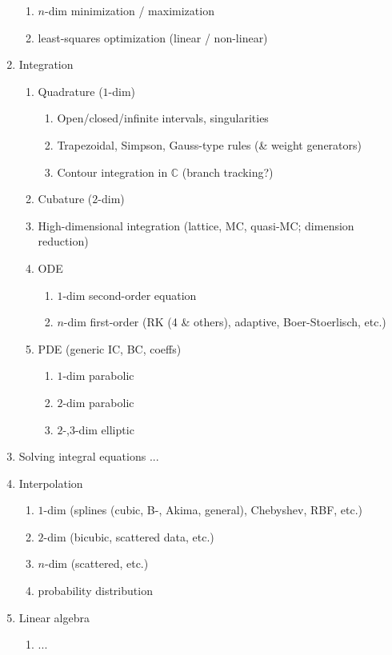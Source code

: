 \documentclass[10pt,dvipdfmx,letterpaper,twoside]{article}
\newcommand{\CC}{{\mathbb{C}}}
\begin{document}
\begin{enumerate}
\begin{enumerate}
  \item $n$-dim minimization / maximization
  \item least-squares optimization (linear / non-linear)
  \end{enumerate}
\item Integration
  \begin{enumerate}
  \item Quadrature ($1$-dim)
    \begin{enumerate}
    \item Open/closed/infinite intervals, singularities
    \item Trapezoidal, Simpson, Gauss-type rules (\& weight generators)
    \item Contour integration in $\CC$ (branch tracking?)
    \end{enumerate}
  \item Cubature ($2$-dim)
  \item High-dimensional integration (lattice, MC, quasi-MC; dimension reduction)
  \item ODE
    \begin{enumerate}
    \item $1$-dim second-order equation
    \item $n$-dim first-order (RK (4 \& others), adaptive, Boer-Stoerlisch, etc.)
    \end{enumerate}
  \item PDE (generic IC, BC, coeffs)
    \begin{enumerate}
    \item $1$-dim parabolic
    \item $2$-dim parabolic
    \item $2$-,$3$-dim elliptic
    \end{enumerate}
  \end{enumerate}
  \item Solving integral equations ...
\item Interpolation
  \begin{enumerate}
  \item $1$-dim (splines (cubic, B-, Akima, general), Chebyshev, RBF, etc.)
  \item $2$-dim (bicubic, scattered data, etc.)
  \item $n$-dim (scattered, etc.)
  \item probability distribution
  \end{enumerate}
\item Linear algebra
  \begin{enumerate}
  \item ...
  \end{enumerate}
\end{enumerate}
\end{document}
